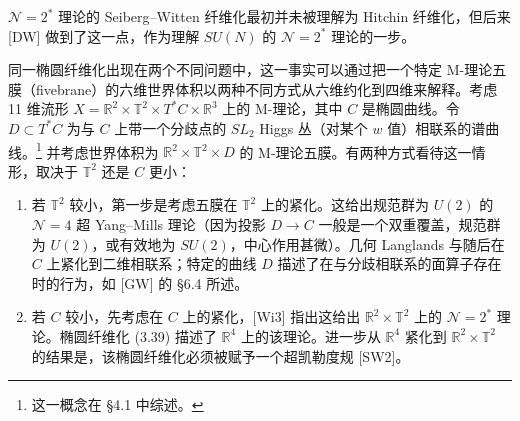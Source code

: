 \documentclass[11pt,a4paper]{article}
\begin{document}

$\mathcal{N}=2^*$ 理论的 Seiberg--Witten 纤维化最初并未被理解为 Hitchin 纤维化，但后来 [DW] 做到了这一点，作为理解 $SU(N)$ 的 $\mathcal{N}=2^*$ 理论的一步。

同一椭圆纤维化出现在两个不同问题中，这一事实可以通过把一个特定 M-理论五膜（fivebrane）的六维世界体积以两种不同方式从六维约化到四维来解释。考虑 11 维流形 $X=\mathbb{R}^2\times\mathbb{T}^2\times T^*C\times\mathbb{R}^3$ 上的 M-理论，其中 $C$ 是椭圆曲线。令 $D\subset T^*C$ 为与 $C$ 上带一个分歧点的 $SL_2$ Higgs 丛（对某个 $w$ 值）相联系的谱曲线。\footnote{这一概念在 §4.1 中综述。} 并考虑世界体积为 $\mathbb{R}^2\times\mathbb{T}^2\times D$ 的 M-理论五膜。有两种方式看待这一情形，取决于 $\mathbb{T}^2$ 还是 $C$ 更小：
\begin{enumerate}[label=(\arabic*),leftmargin=2.2em,itemsep=2pt,topsep=2pt]
\item 若 $\mathbb{T}^2$ 较小，第一步是考虑五膜在 $\mathbb{T}^2$ 上的紧化。这给出规范群为 $U(2)$ 的 $\mathcal{N}=4$ 超 Yang--Mills 理论（因为投影 $D\to C$ 一般是一个双重覆盖，规范群为 $U(2)$，或有效地为 $SU(2)$，中心作用甚微）。几何 Langlands 与随后在 $C$ 上紧化到二维相联系；特定的曲线 $D$ 描述了在与分歧相联系的面算子存在时的行为，如 [GW] 的 §6.4 所述。
\item 若 $C$ 较小，先考虑在 $C$ 上的紧化，[Wi3] 指出这给出 $\mathbb{R}^2\times\mathbb{T}^2$ 上的 $\mathcal{N}=2^*$ 理论。椭圆纤维化 (3.39) 描述了 $\mathbb{R}^4$ 上的该理论。进一步从 $\mathbb{R}^4$ 紧化到 $\mathbb{R}^2\times\mathbb{T}^2$ 的结果是，该椭圆纤维化必须被赋予一个超凯勒度规 [SW2]。
\end{enumerate}


\end{document}
